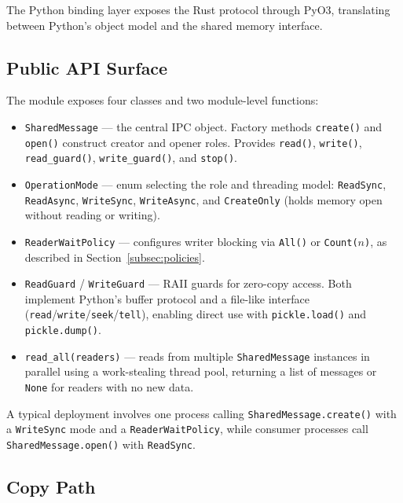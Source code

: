 The Python binding layer exposes the Rust protocol through PyO3, translating between Python's object model and the shared memory interface.

\subsection{Public API Surface}
\label{subsec:python_api}

The module exposes four classes and two module-level functions:

\begin{itemize}
    \item \texttt{SharedMessage} --- the central IPC object. Factory methods \texttt{create()} and \texttt{open()} construct creator and opener roles. Provides \texttt{read()}, \texttt{write()}, \texttt{read\_guard()}, \texttt{write\_guard()}, and \texttt{stop()}.

    \item \texttt{OperationMode} --- enum selecting the role and threading model: \texttt{ReadSync}, \texttt{ReadAsync}, \texttt{WriteSync}, \texttt{WriteAsync}, and \texttt{CreateOnly} (holds memory open without reading or writing).

    \item \texttt{ReaderWaitPolicy} --- configures writer blocking via \texttt{All()} or \texttt{Count($n$)}, as described in Section~\ref{subsec:policies}.

    \item \texttt{ReadGuard} / \texttt{WriteGuard} --- RAII guards for zero-copy access. Both implement Python's buffer protocol and a file-like interface (\texttt{read}/\-\texttt{write}/\-\texttt{seek}/\-\texttt{tell}), enabling direct use with \texttt{pickle.load()} and \texttt{pickle.dump()}.

    \item \texttt{read\_all(readers)} --- reads from multiple \texttt{SharedMessage} instances in parallel using a work-stealing thread pool, returning a list of messages or \texttt{None} for readers with no new data.

\end{itemize}

A typical deployment involves one process calling \texttt{Shared\-Message.create()} with a \texttt{Write\-Sync} mode and a \texttt{Reader\-Wait\-Policy}, while consumer processes call \texttt{Shared\-Message.open()} with \texttt{Read\-Sync}.

\subsection{Copy Path}
\label{subsec:copy_path}

